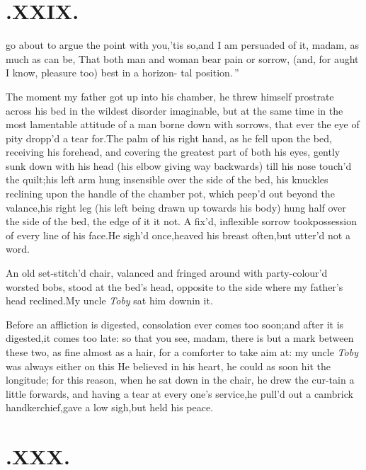 \documentclass{article}
\begin{document}
\section{.\quad  XXIX.}

 go about to argue the\break
point with you,\tsk ’tis so,\tsk and
I am persuaded of it, madam, as much\break
as can be, \lqq That both man and woman\break
\lqq bear pain or sorrow, (and, for aught I\break
\lqq know, pleasure too) best in a horizon-\break
\lqq tal position.\,”

The moment my father got up into his chamber, he threw himself prostrate across his
bed in the wildest disorder im\-aginable, but at the same time in the
most lamentable attitude of a man borne down with sorrows, that
ever the eye of pity dropp’d a tear for.\tsh The
palm of his right hand, as he fell upon the bed, receiving his
forehead, and covering the greatest part of both his eyes, gently
sunk down with his head (his elbow giving way backwards) till his
nose touch’d the quilt;\tsh his left arm hung
insensible over the side of the bed, his knuckles reclining upon
the handle of the chamber
pot, which peep’d out beyond the va\-lance,\tsh his right leg (his
left being drawn up towards his body) hung half over the side of
the bed, the edge of it 
it not. A fix’d, inflexible sorrow took\break possession of every line
of his face.\tsk He sigh’d once,\tsh heaved his breast
often,\tsk\break but utter’d not a word.

An old set-stitch’d chair, valanced and fringed around
with party-colour’d wor\-sted bobs, stood at the bed’s
head, opposite to the side where my father’s head
reclined.\tsk My uncle \textit{Toby} sat him down\break in it.

Before an affliction is digested,\tsh\break
consolation ever comes too soon;\tsk and 
after it is digested,\tsk it comes too late:
so that you see, madam, there is but a
mark between these two, as fine almost as a hair, for a
comforter to take aim at: my uncle \textit{Toby} was always
either on this
\break
He believed in his heart, he could as soon hit the longitude;
for this reason, when he sat down in the chair, he drew the
cur-tain a little forwards, and having a tear at every one’s
service,\tsk he pull’d out a cambrick handkerchief,\tsh gave a
low sigh,\tsh but held his peace.

\section{.\quad  XXX.}
\end{document}
